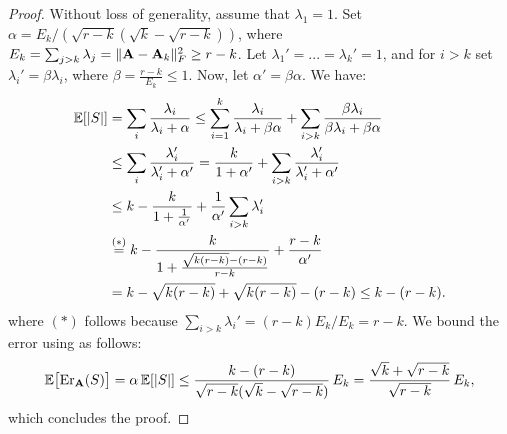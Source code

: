 \documentclass{article}
\begin{document}
  \begin{proof}
    Without loss of generality, assume that $\lambda_1=1$. Set
    $\alpha=E_k/(\sqrt{r-k}(\sqrt k-\sqrt{r-k}))$, where $E_k=\sum_{j>k}\lambda_j=\|\mathbf A-\mathbf A_k\|_F^2\geq r-k$. Let
    $\lambda_1'=...=\lambda_k'=1$, and for $i>k$ set
    $\lambda_i'=\beta\lambda_i$, where $\beta = \frac{r-k}{E_k}\leq 1$. Now, let $\alpha'=\beta\alpha$. We have:
  \begin{align*}
    \mathbb E[|S|] &= \sum_{i}\frac{\lambda_i}{\lambda_i+\alpha} 
   \leq\sum_{i=1}^k\frac{\lambda_i}{\lambda_i+\beta\alpha}
    + \sum_{i>k}\frac{\beta\lambda_i}{\beta\lambda_i+\beta\alpha}\\
&   \leq \sum_i \frac{\lambda_i'}{\lambda_i'+\alpha'}
=\frac{k}{1+\alpha'} + \sum_{i> k}\frac{\lambda_i'}{\lambda_i'+\alpha'}\\
    &\leq
k - \frac k{1+\frac1{\alpha'}}+  \frac1{\alpha'} \sum_{i>k} \lambda_i' \\
    &\overset{(*)}{=} k - \frac k{1 + \frac{\sqrt{k(r-k)} - (r-k)}{r-k}}
      +\frac{r-k}{\alpha'}\\
    &=k - \sqrt{k(r-k)} + \sqrt{k(r-k)} - (r-k)\leq k - (r-k).
  \end{align*}
    where $(*)$ follows because $\sum_{i>
      k}\lambda_i'=(r-k)E_k/E_k=r-k$. We bound the error using as follows:
    \begin{align*}
      \mathbb E\big[\mathrm{Er}_\mathbf A(S)\big] = \alpha\,\mathbb E[|S|]\leq
      \frac{k-(r-k)}{\sqrt{r-k}(\sqrt k-\sqrt{r-k})}\,E_k
      =\frac{\sqrt k +\sqrt{r-k}}{\sqrt{r-k}}\,E_k,
    \end{align*}
which concludes the proof.
  \end{proof}
\end{document}
